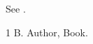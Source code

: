 \documentclass{article}
\begin{document}
See \cite{b}.
\begin{thebibliography}{1}
\backrefparscanfalse
{} B. Author, Book.\backrefprint
\end{thebibliography}
\end{document}
